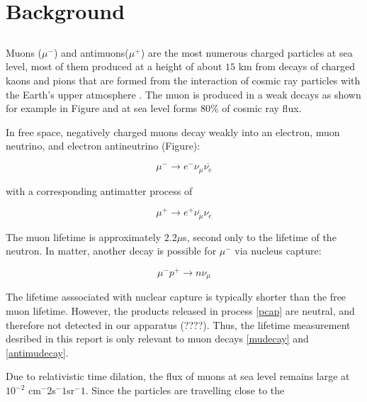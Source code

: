
\section{Background}

\subsection{}
Muons ($\mu^-$) and antimuons($\mu^+$) are the most numerous charged
particles at sea level\cite{pdg}, most of them produced at a height of
about $15$ km from decays of charged kaons and pions that are formed
from the interaction of cosmic ray particles with the Earth's upper
atmosphere \cite{amsler}. The muon is produced in a weak decays as
shown for example in Figure and at sea level forms $80\%$ of cosmic
ray flux.


In free space, negatively charged muons decay weakly into an
electron, muon neutrino, and electron antineutrino \cite{easwar}
(Figure):

\begin{equation}\mu^- \rightarrow e^- \nu_{\mu}\overline{\nu_e}\label{mudecay}\end{equation}

with a corresponding antimatter process of

\begin{equation}\mu^+ \rightarrow e^+ \overline{\nu_{\mu}}{\nu_e}\label{antimudecay}\end{equation}

The muon lifetime is approximately $2.2 \mu$s\cite{easwar}, second
only to the lifetime of the neutron. In matter, another decay is
possible for $\mu^-$ via nucleus capture:

\begin{equation}\mu^-p^+ \rightarrow n \nu_{\mu} \label{pcap} \end{equation}

The lifetime asssociated with nuclear capture is typically shorter
than the free muon lifetime. However, the products released in process
\eqref{pcap} are neutral, and therefore not detected in our
apparatus (????). Thus, the lifetime measurement desribed in this report is
only relevant to muon decays \eqref{mudecay} and \eqref{antimudecay}.

Due to relativistic time dilation, the flux of muons at sea level
remains large at $10^{-2}$ cm$^-2$s$^-1$sr$^-1$. Since the particles are travelling close to the 


